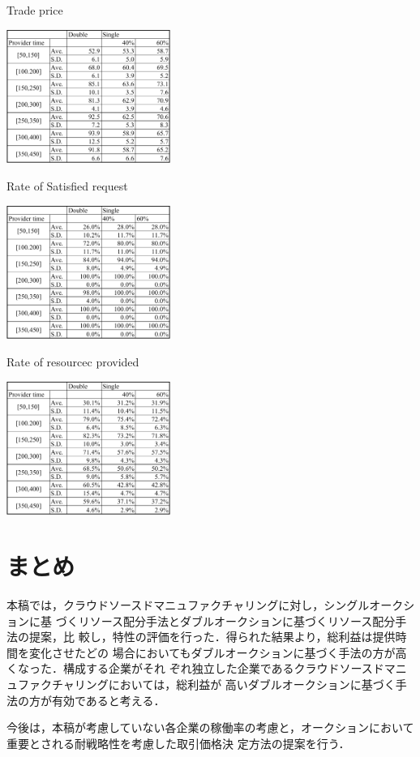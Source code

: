 \documentclass{ujarticle}
\begin{document}
\begin{table}[H]
  \caption{Trade price}
  \centering
  \includegraphics[width=0.4\textwidth]{trade.pdf} 
  \label{tab:trade}
\end{table}

\begin{table}[H]
  \caption{Rate of Satisfied request}
  \centering
  \includegraphics[width=0.4\textwidth]{request_rate.pdf} 
  \label{tab:request_rate}
\end{table}

\begin{table}[H]

  \caption{Rate of resourcec provided}
  \label{tab:provide_rate}
  \centering
  \includegraphics[width=0.4\textwidth]{provide_rate.pdf} 
\end{table}

\section{まとめ}
本稿では，クラウドソースドマニュファクチャリングに対し，シングルオークションに基
づくリソース配分手法とダブルオークションに基づくリソース配分手法の提案，比
較し，特性の評価を行った．得られた結果より，総利益は提供時間を変化させたどの
場合においてもダブルオークションに基づく手法の方が高くなった．構成する企業がそれ
ぞれ独立した企業であるクラウドソースドマニュファクチャリングにおいては，総利益が
高いダブルオークションに基づく手法の方が有効であると考える．\par
今後は，本稿が考慮していない各企業の稼働率の考慮と，オークションにおいて重要とされる耐戦略性を考慮した取引価格決
定方法の提案を行う．
 

\end{document}
